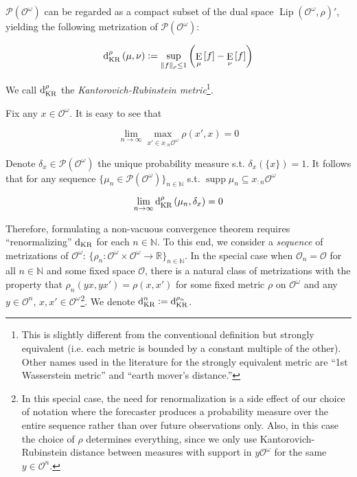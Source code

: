 \documentclass[11pt]{article}
\theoremstyle{definition}
\theoremstyle{plain}
\newcommand{\Nats}{\mathbb{N}}
\newcommand{\Reals}{\mathbb{R}}
\newcommand{\N}[1]{\lVert #1 \rVert}
\newcommand{\Sq}[2]{\{#1\}_{#2 \in \Nats}}
\newcommand{\Sqn}[1]{\Sq{#1}{n}}
\DeclareMathOperator{\E}{E}
\newcommand{\PM}{\mathcal{P}}
\newcommand{\Lp}{{\operatorname{Lip}}}
\DeclareMathOperator{\Sp}{supp}
\newcommand{\DKR}{\operatorname{d}_{\textnormal{KR}}}
\newcommand{\Ob}{\mathcal{O}}
\newcommand{\OO}{\Ob^\omega}
\newcommand{\PMO}{\PM(\OO)}
\begin{document}
$\PMO$ can be regarded as a compact subset of the dual space $\Lp\left(\OO,\rho\right)'$, yielding the following metrization of $\PMO$:

\begin{equation}
\DKR^\rho\left(\mu,\nu\right):=\sup_{\N{f}_\rho \leq 1}{\left(\E_\mu\left[f\right] - \E_\nu\left[f\right]\right)}
\end{equation}

We call $\DKR^\rho$ the \emph{Kantorovich-Rubinstein metric}\footnote{This is slightly different from the conventional definition but strongly equivalent (i.e. each metric is bounded by a constant multiple of the other). Other names used in the literature for the strongly equivalent metric are \enquote{1st Wasserstein metric} and \enquote{earth mover's distance.}}.

Fix any $x \in \OO$. It is easy to see that

\begin{equation}
\lim_{n \rightarrow \infty} \max_{x' \in x_{:n}\OO} \rho\left(x', x\right) = 0
\end{equation}

Denote $\delta_x \in \PMO$ the unique probability measure s.t. $\delta_x\left(\{x\}\right)=1$. It follows that for any sequence $\Sqn{\mu_n \in \PMO}$ s.t. $\Sp{\mu_n} \subseteq x_{:n}\OO$

\begin{equation}
\lim_{n \rightarrow \infty} \DKR^\rho\left(\mu_n, \delta_x\right) = 0
\end{equation}

Therefore, formulating a non-vacuous convergence theorem requires \enquote{renormalizing} $\DKR$ for each $n \in \Nats$. To this end, we consider a \emph{sequence} of metrizations of $\OO$: $\Sqn{\rho_n: \OO \times \OO \rightarrow \Reals}$. In the special case when $\Ob_n=\Ob$ for all $n \in \Nats$ and some fixed space $\Ob$, there is a natural class of metrizations with the property that $\rho_n(yx,yx')=\rho(x,x')$ for some fixed metric $\rho$ on $\OO$ and any $y \in \Ob^n$, $x,x' \in \OO$\footnote{In this special case, the need for renormalization is a side effect of our choice of notation where the forecaster produces a probability measure over the entire sequence rather than over future observations only. Also, in this case the choice of $\rho$ determines everything, since we only use Kantorovich-Rubinstein distance between measures with support in $y\OO$ for the same $y \in \Ob^n$.}. We denote $\DKR^n:=\DKR^{\rho_n}$.
\end{document}
